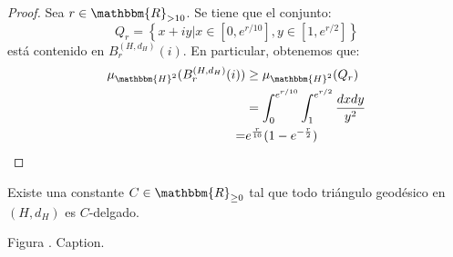 \documentclass[12pt]{report}
\newcounter{it}
\theoremstyle{largebreak}
\newcounter{figcount}
\newcommand{\bbm}[1]{\ensuremath{\mathbbm{#1}}}
\begin{document}
    \begin{proof}
        Sea $r\in\bbm{R}_{>10}$. Se tiene que el conjunto:
        \begin{equation*}
            Q_r=\left\{x+iy\Big|x\in[0,e^{ r/10}],y\in[1,e^{r/2}] \right\}
        \end{equation*}
        está contenido en $B_r^{(H,d_H)}(i)$. En particular, obtenemos que:
        \begin{equation*}
            \begin{split}
                \mu_{\bbm{H}^2}(B_r^{(H,d_H)}(i))&\geq\mu_{\bbm{H}^2}(Q_r)\\
                &=\int_{0}^{e^{r/10}}\int_{1}^{e^{r/2}}\frac{dxdy}{y^2}\\
                =&e^{\frac{r}{10}}(1-e^{-\frac{r}{2}})\\
            \end{split}
        \end{equation*}
    \end{proof}

    \begin{theor}
        Existe una constante $C\in\bbm{R}_{\geq0}$ tal que todo triángulo geodésico en $(H,d_H)$ es $C$-delgado.
    \end{theor}



    

    \begin{minipage}{\textwidth}
    	\begin{center}
	    Figura \thefigcount. Caption.
	\end{center}
    \end{minipage}
\end{document}
